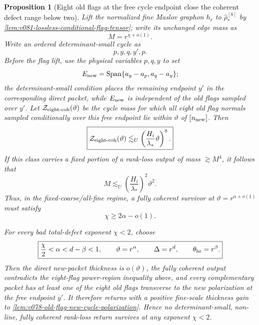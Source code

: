 \documentclass[10pt]{article}
\newtheorem{proposition}[theorem]{Proposition}
\newcommand{\Span}{\operatorname{Span}}
\begin{document}
\begin{proposition}[Eight old flags at the free cycle endpoint close the coherent defect range
below two]
\label{prop:v081-eight-flag-full-defect-exclusion}
Lift the normalized fine Maslov graphon \(h_r\) to
\(\widehat\rho_*^{[8]}\) by
\cref{lem:v081-lossless-conditional-flag-tensor}; write its unchanged edge mass as
\[
M=r^{\chi+o(1)}.
\]
Write an ordered determinant-small cycle as
\[
p,y,q,y',p.
\]
Before the flag lift, use the physical variables \(p,q,y\) to set
\[
E_{\rm new}
=
\Span\{a_y-a_p,a_q-a_y\};
\]
the determinant-small condition places the remaining endpoint \(y'\) in the corresponding direct
packet, while \(E_{\rm new}\) is independent of the old flags sampled over \(y'\).
Let \(\mathcal Z_{\rm eight\text{-}coh}(\vartheta)\) be the cycle mass for which all eight old
flag normals sampled conditionally over this free endpoint lie within \(\vartheta\) of
\([n_{\rm new}]\).  Then
\begin{equation}
\label{eq:v081-eight-flag-coherent-cycle-cost}
\boxed{
\mathcal Z_{\rm eight\text{-}coh}(\vartheta)
\lesssim_U
\left(\frac{H_i}{\lambda_*}\vartheta\right)^8.
}
\end{equation}
If this class carries a fixed portion of a rank-loss output of mass
\(\gtrsim M^4\), it follows that
\begin{equation}
\label{eq:v081-eight-flag-coherent-necessary}
\boxed{
M
\lesssim_U
\left(\frac{H_i}{\lambda_*}\right)^2\vartheta^2.
}
\end{equation}
Thus, in the fixed-coarse/all-fine regime, a fully coherent survivor at
\(\vartheta=r^{\alpha+o(1)}\) must satisfy
\begin{equation}
\label{eq:v081-eight-flag-power-region}
\boxed{\chi\ge2\alpha-o(1).}
\end{equation}

For every bad total-defect exponent \(\chi<2\), choose
\begin{equation}
\label{eq:v081-full-defect-parameter-window}
\boxed{
\frac{\chi}{2}<\alpha<d-\beta<1,
\qquad
\vartheta=r^\alpha,
\qquad
\Delta=r^d,
\qquad
\theta_{\rm hr}=r^\beta.
}
\end{equation}
Then the direct new-packet thickness is \(o(\vartheta)\), the fully coherent output contradicts
the eight-flag power-region inequality above, and every complementary packet has at least one of the
eight old flags transverse to the new polarization at the free endpoint \(y'\).  It therefore
returns with a positive fine-scale thickness gain to
\cref{lem:v078-old-flag-new-cycle-polarization}.  Hence no determinant-small,
non-line, fully coherent rank-loss return survives at any exponent \(\chi<2\).
\end{proposition}
\end{document}
